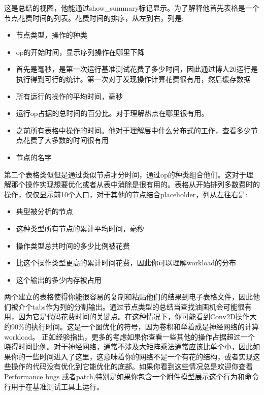 这是总结的视图，他能通过show\_summary标记显示。为了解释他首先表格是一个节点花费时间的列表。花费时间的排序，从左到右，列是:
\begin{itemize}
\item 节点类型，操作的种类
\item op的开始时间，显示序列操作在哪里下降
\item 首先是毫秒，是第一次运行基准测试花费了多少时间，因此通过博人20运行是执行得到可行的统计。第一次对于发现操作计算花费很有用，然后缓存数据
\item 所有运行的操作的平均时间，毫秒
\item 运行op占据的总时间的百分比。对于理解热点在哪里很有用。
\item 之前所有表格中操作的时间。他对于理解层中什么分布式的工作，查看多少节点花费了大多数的时间很有用
\item 节点的名字
\end{itemize}
第二个表格类似但是通过类似节点才分时间，通过op的种类组合他们。这对于理解那个操作实现想要优化或者从表中消除是很有用的。表格从开始排列多数费时的操作，仅仅显示前10个入口，对于其他的节点结合placeholder，列从左往右是:
\begin{itemize}
\item 典型被分析的节点
\item 这种类型所有节点的累计平均时间，毫秒
\item 操作类型总共时间的多少比例被花费
\item 比这个操作类型更高的累计时间花费，因此你可以理解workload的分布
\item 这个输出的多少内存被占用
\end{itemize}
两个建立的表格使得你能很容易的复制和粘贴他们的结果到电子表格文件，因此他们被介个tabs作为列的分割输出。通过节点类型的总结当查找油画机会可能很有用，因为它是代码花费时间的关键点。在这种情况下，你可能看到Conv2D操作大约90\%的执行时间。这是一个图优化的符号，因为卷积和举着成是神经网络的计算workload。
正如经验指出，更多的考虑如果你查看一些其他的操作占据超过一个晓得时间比例。对于神经网络，通常不涉及大矩阵乘法通常应该比单个小，因此如果你的一些时间进入了这里，这意味着你的网络不是一个有花的结构，或者实现这些操作的代码没有优化到它能优化的底部。如果你看到这些情况总是欢迎你查看\href{https://github.com/tensorflow/tensorflow/issues}{Performance bugs }或者patch,特别是如果你包含一个附件模型展示这个行为和命令行用于在基准测试工具上运行。

